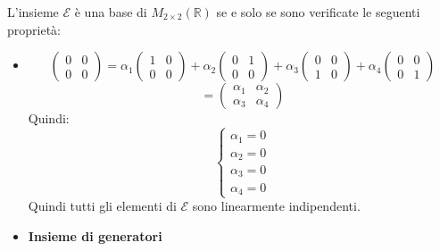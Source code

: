 \documentclass[a4paper]{article}
\theoremstyle{break}
\theoremstyle{break}
\theoremstyle{break}
\theoremstyle{break}
\begin{document}
\begin{enumerate}
        \vspace{1em}
        \noindent L'insieme \( \mathcal{E} \) è una base di \( M_{2 \times 2}(\mathbb{R}) \) se e solo se
        sono verificate le seguenti proprietà:
        \begin{itemize}
          \item 
            \[
              \begin{pmatrix} 
                0 & 0\\
                0 & 0
              \end{pmatrix}
              =
              \alpha_1 \begin{pmatrix} 
                1 & 0\\
                0 & 0
              \end{pmatrix}
              +
              \alpha_2 \begin{pmatrix} 
                0 & 1\\
                0 & 0
              \end{pmatrix}
              +
              \alpha_3 \begin{pmatrix} 
                0 & 0\\
                1 & 0
              \end{pmatrix}
              +
              \alpha_4 \begin{pmatrix} 
                0 & 0\\
                0 & 1
              \end{pmatrix}
            \]
            \[
              = \begin{pmatrix} 
                \alpha_1 & \alpha_2\\
                \alpha_3 & \alpha_4
              \end{pmatrix}
            \]
            Quindi:
            \[
              \begin{cases}
                \alpha_1 = 0\\
                \alpha_2 = 0\\
                \alpha_3 = 0\\
                \alpha_4 = 0
              \end{cases}
            \]
            Quindi tutti gli elementi di \( \mathcal{E} \) sono linearmente indipendenti.

          \item \textbf{Insieme di generatori}


\end{itemize}
\end{enumerate}
\end{document}
